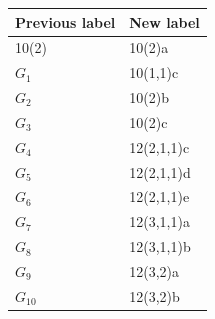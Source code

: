 \documentclass[12pt]{amsart}
\theoremstyle{definition}
\numberwithin{equation}{section}
\begin{document}
\begin{center}
\begin{tabular}{ll}
Previous label & New label\\
\hline
10(2) & 10(2)a\\
$G_1$ & 10(1,1)c\\
$G_2$ & 10(2)b\\
$G_3$ & 10(2)c\\
$G_4$ & 12(2,1,1)c\\
$G_5$ & 12(2,1,1)d\\
$G_6$ & 12(2,1,1)e\\
$G_7$ & 12(3,1,1)a\\
$G_8$ & 12(3,1,1)b\\
$G_9$ & 12(3,2)a\\
$G_{10}$ & 12(3,2)b
\end{tabular}
\end{center}
\end{document}
